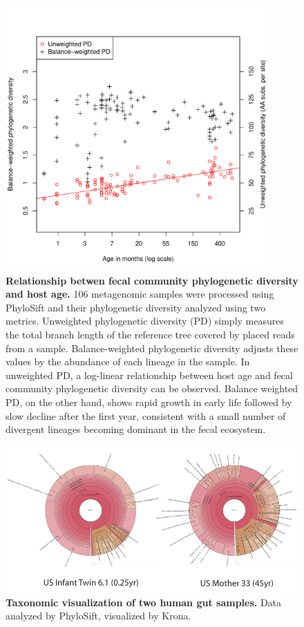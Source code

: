 \documentclass[10pt]{article}
\begin{document}
\begin{figure}[hp]
\begin{center}
\includegraphics[width=4in]{figures/phylo_diversity.pdf}
\end{center}
\caption{\textbf{Relationship betwen fecal community phylogenetic diversity and host age.} 106 metagenomic samples were processed using PhyloSift and their phylogenetic diversity analyzed using two metrics. Unweighted phylogenetic diversity (PD) simply measures the total branch length of the reference tree covered by placed reads from a sample. Balance-weighted phylogenetic diversity adjusts these values by the abundance of each lineage in the sample. In unweighted PD, a log-linear relationship between host age and fecal community phylogenetic diversity can be observed. Balance weighted PD, on the other hand, shows rapid growth in early life followed by slow decline after the first year, consistent with a small number of  divergent lineages becoming dominant in the fecal ecosystem.}
\label{fig:agediversity}
\end{figure}

\begin{figure}[hp]
\begin{center}
\includegraphics[width=6.5in]{figures/krona_two.pdf}
\end{center}
\caption{\textbf{Taxonomic visualization of two human gut samples.} Data analyzed by PhyloSift, visualized by Krona.}
\label{fig:kronaplots}
\end{figure}


\clearpage
\end{document}
